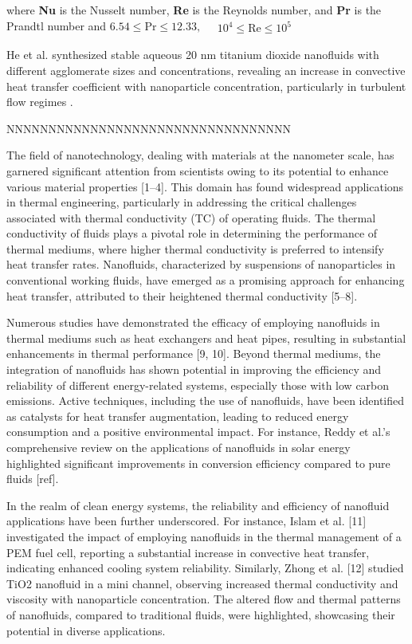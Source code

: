 \documentclass{article}
\begin{document}
where  \textbf{Nu} is the Nusselt number,  \textbf{Re}  is the Reynolds number, and  \textbf{Pr} is the Prandtl number and $ 6.54 \leq \text{Pr} \leq 12.33, \quad \begin{matrix}
10^4 \leq \text{Re} \leq 10^5
\end{matrix} $

He et al. synthesized stable aqueous 20 nm titanium dioxide nanofluids with different agglomerate sizes and concentrations, revealing an increase in convective heat transfer coefficient with nanoparticle concentration, particularly in turbulent flow regimes \cite{ref2}.

NNNNNNNNNNNNNNNNNNNNNNNNNNNNNNNNNN

The field of nanotechnology, dealing with materials at the nanometer scale, has garnered significant attention from scientists owing to its potential to enhance various material properties [1–4]. This domain has found widespread applications in thermal engineering, particularly in addressing the critical challenges associated with thermal conductivity (TC) of operating fluids. The thermal conductivity of fluids plays a pivotal role in determining the performance of thermal mediums, where higher thermal conductivity is preferred to intensify heat transfer rates. Nanofluids, characterized by suspensions of nanoparticles in conventional working fluids, have emerged as a promising approach for enhancing heat transfer, attributed to their heightened thermal conductivity [5–8].

Numerous studies have demonstrated the efficacy of employing nanofluids in thermal mediums such as heat exchangers and heat pipes, resulting in substantial enhancements in thermal performance [9, 10]. Beyond thermal mediums, the integration of nanofluids has shown potential in improving the efficiency and reliability of different energy-related systems, especially those with low carbon emissions. Active techniques, including the use of nanofluids, have been identified as catalysts for heat transfer augmentation, leading to reduced energy consumption and a positive environmental impact. For instance, Reddy et al.'s comprehensive review on the applications of nanofluids in solar energy highlighted significant improvements in conversion efficiency compared to pure fluids [ref].

In the realm of clean energy systems, the reliability and efficiency of nanofluid applications have been further underscored. For instance, Islam et al. [11] investigated the impact of employing nanofluids in the thermal management of a PEM fuel cell, reporting a substantial increase in convective heat transfer, indicating enhanced cooling system reliability. Similarly, Zhong et al. [12] studied TiO2 nanofluid in a mini channel, observing increased thermal conductivity and viscosity with nanoparticle concentration. The altered flow and thermal patterns of nanofluids, compared to traditional fluids, were highlighted, showcasing their potential in diverse applications.
\end{document}
